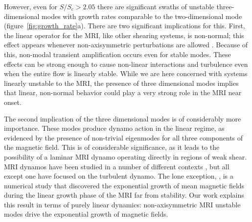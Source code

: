 \documentclass[aps,prl,reprint,superscriptaddress]{revtex4-1}
\newcommand{\SSC}{S/S_{c}}
\begin{document}
However, even for $\SSC> 2.05$ there are significant swaths of unstable three-dimensional modes with growth rates comparable to the two-dimensional mode (figure~\ref{fig:growth_rate}a).
There are two significant implications for this.
First, the linear operator for the MRI, like other shearing systems, is non-normal; this effect appears whenever non-axisymmetric perturbations are allowed \citep[see][for a discussion relevant to the MRI]{1992MNRAS.255P..25K}.
Because of this, non-modal transient amplification occurs even for stable modes.
These effects can be strong enough to cause non-linear interactions and turbulence even when the entire flow is linearly stable.
While we are here concerned with systems linearly unstable to the MRI, the presence of three dimensional modes implies that linear, non-normal behavior could play a very strong role in the MRI near onset.

The second implication of the three dimensional modes is of considerably more importance.
These modes produce dynamo action in the linear regime, as evidenced by the presence of non-trivial eigenmodes for all three components of the magnetic field.
This is of considerable significance, as it leads to the possibility of a laminar MRI dynamo operating directly in regions of weak shear.
MRI dynamos have been studied in a number of different contexts \citep{2007PhRvL..98y4502R,2011ApJ...740...18O,2015PhRvL.114h5002S}, but all except one have focused on the turbulent dynamo. The lone exception, \citet{2016MNRAS.462..818B}, is a numerical study that discovered the exponential growth of mean magnetic fields during the linear growth phase of the MRI far from stability.
Our work explains this result in terms of purely linear dynamics:
non-axisymmetric MRI unstable modes drive the exponential growth of magnetic fields.


\end{document}
